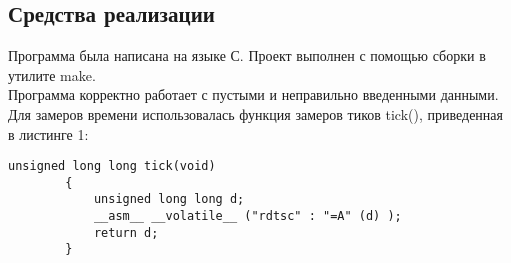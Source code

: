 \documentclass[a4paper, 14pt]{article}
\begin{document}
		\subsection{Средства реализации}
		Программа была написана на языке С. Проект выполнен с помощью сборки в утилите make.\\
		Программа корректно работает с пустыми и неправильно введенными данными.\\
		Для замеров времени использовалась функция замеров тиков tick(), приведенная в листинге 1:\\
		\begin{lstlisting}[label=some-code,caption=Функция замера времени]
		unsigned long long tick(void)
		{
    		unsigned long long d;
    		__asm__ __volatile__ ("rdtsc" : "=A" (d) );
    		return d;
		}
		\end{lstlisting}
\end{document}
